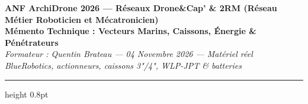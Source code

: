 \documentclass[a4paper,10pt]{article}
\begin{document}
\begin{center}
  {\small\bfseries\textcolor{OceanDeep}{ANF ArchiDrone 2026 --- Réseaux Drone\&Cap' \& 2RM (Réseau Métier Roboticien et Mécatronicien)}} \\
  \vspace{1pt}
  {\large\bfseries\textcolor{OceanMedium}{Mémento Technique : Vecteurs Marins, Caissons, Énergie \& Pénétrateurs}} \\
  \vspace{1pt}
  {\scriptsize\textit{Formateur : Quentin Brateau --- 04 Novembre 2026 --- Matériel réel BlueRobotics, actionneurs, caissons 3"/4", WLP-JPT \& batteries}}
\end{center}
\vspace{-9pt}
\hrule height 0.8pt
\vspace{2pt}
\end{document}
